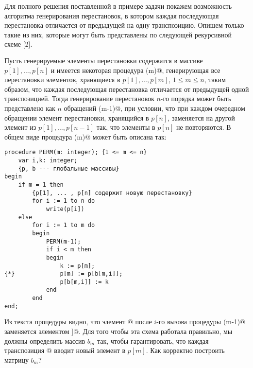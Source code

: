 \documentclass[12pt,a4paper]{article}
\theoremstyle{plain}
\theoremstyle{definition}
\theoremstyle{remark}
\begin{document}
Для полного решения поставленной в примере задачи покажем возможность алгоритма генерирования перестановок, в котором каждая последующая перестановка отличается от предыдущей на одну транспозицию. Опишем только такие из них, которые могут быть представлены по следующей рекурсивной схеме [2].

Пусть генерируемые элементы перестановки содержатся в массиве $p[1],\ldots,p[n]$ и имеется некоторая процедура \verb@PERM(m)@, генерирующая все перестановки элементов, хранящиеся в $p[1],\ldots,p[m]$, $1 \le m \le n$, таким образом, что каждая последующая перестановка отличается от предыдущей одной транспозицией. Тогда генерирование перестановок $n$-го порядка может быть представлено как $n$ обращений \verb@PERM(m-1)@, при условии, что при каждом очередном обращении элемент перестановки, хранящийся в $p[n]$, заменяется на другой элемент из $p[1],\ldots,p[n-1]$ так, что элементы в $p[n]$ не повторяются. В общем виде процедура \verb@PERM(m)@ может быть описана так:

\begin{verbatim}
procedure PERM(m: integer); {1 <= m <= n}
    var i,k: integer;
    {p, b --- глобальные массивы}
begin
    if m = 1 then
        {p[1], ... , p[n] содержит новую перестановку}
        for i := 1 to n do
            write(p[i])
    else
        for i := 1 to m do
        begin
            PERM(m-1);
            if i < m then
            begin
                k := p[m];
{*}             p[m] := p[b[m,i]];
                p[b[m,i]] := k
            end
        end
end;
\end{verbatim}

Из текста процедуры видно, что элемент \verb@p[m]@ после $i$-го вызова процедуры \verb@PERM(m-1)@ заменяется элементом \verb@p[b[m,i]]@. Для того чтобы эта схема работала правильно, мы должны определить массив $b_m$ так, чтобы гарантировать, что каждая транспозиция \verb@{*}@ вводит новый элемент в $p[m]$. Как корректно построить матрицу $b_m$?
\end{document}
